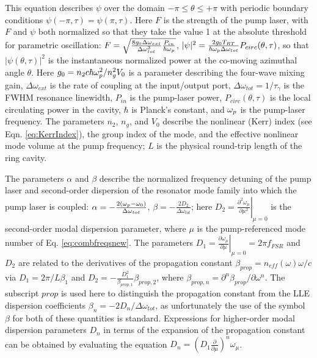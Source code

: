 This equation describes $\psi$ over the domain $-\pi\leq\theta\leq+\pi$ with periodic boundary conditions $\psi(-\pi,\tau)=\psi(\pi,\tau)$. Here $F$ is the strength of the pump laser, with $F$ and $\psi$ both normalized so that they  take the value 1 at the absolute threshold for parametric oscillation: $F=\sqrt{\frac{8 g_0\Delta\omega_{ext}}{\Delta\omega_{tot}^3}\frac{P_{in}}{\hbar \omega_{p}}}$, $|\psi|^2=\frac{2g_0T_{RT}}{\hbar\omega_{p}\Delta\omega_{tot}}P_{circ}(\theta,\tau)$, so that $|\psi(\theta,\tau)|^2$ is the instantaneous normalized power at the co-moving azimuthal angle $\theta$. Here $g_0=n_2 c \hbar \omega_{p}^2/n_g^2 V_0$ is a parameter describing the four-wave mixing gain, $\Delta\omega_{ext}$ is the rate of coupling at the input/output port, $\Delta\omega_{tot}=1/\tau_\gamma$ is the FWHM resonance linewidth, $P_{in}$ is the pump-laser power, $P_{circ}(\theta,\tau)$ is the local circulating power in the cavity, $\hbar$ is Planck's constant, and $\omega_{p}$ is the pump-laser frequency. The parameters $n_2$, $n_g$, and $V_0$ describe the nonlinear (Kerr) index (see Eqn. \ref{eq:KerrIndex}), the group index of the mode, and the effective nonlinear mode volume at the pump frequency; $L$ is the physical round-trip length of the ring cavity. 

The parameters $\alpha$ and $\beta$ describe the normalized frequency detuning of the pump laser and second-order dispersion of the resonator mode family into which the pump laser is coupled: $\alpha=-\frac{2(\omega_{p}-\omega_0)}{\Delta\omega_{tot}}$, $\beta=-\frac{2 D_2}{\Delta\omega_{tot}}$; here $D_2=\left.\frac{\partial^2\omega_\mu}{\partial \mu^2}\right|_{\mu=0}$ is the second-order modal dispersion parameter, where $\mu$ is the pump-referenced mode number of Eq. \ref{eq:combfreqsnew}. The parameters $D_1=\left.\frac{\partial\omega_\mu}{\partial\mu}\right|_{\mu=0}=2\pi f_{FSR}$ and $D_2$ are related to the derivatives of the propagation constant $\beta_{prop}=n_{eff}(\omega)\omega/c$ via $D_1=2\pi/L\beta_1$ and $D_2=-\frac{D_1^2}{\beta_{prop,1}}\beta_{prop,2}$, where $\beta_{prop,n}=\partial^n\beta_{prop}/\partial\omega^n$. The subscript $prop$ is used here to distinguish the propagation constant from the LLE dispersion coefficients $\beta_n=-2D_n/\Delta\omega_{tot}$, as unfortunately the use of the symbol $\beta$ for both of these quantities is standard. Expressions for higher-order modal dispersion parameters $D_n$ in terms of the expansion of the propagation constant can be obtained by evaluating the equation $D_n=(D_1\frac{\partial}{\partial \mu})^n \omega_\mu$.

